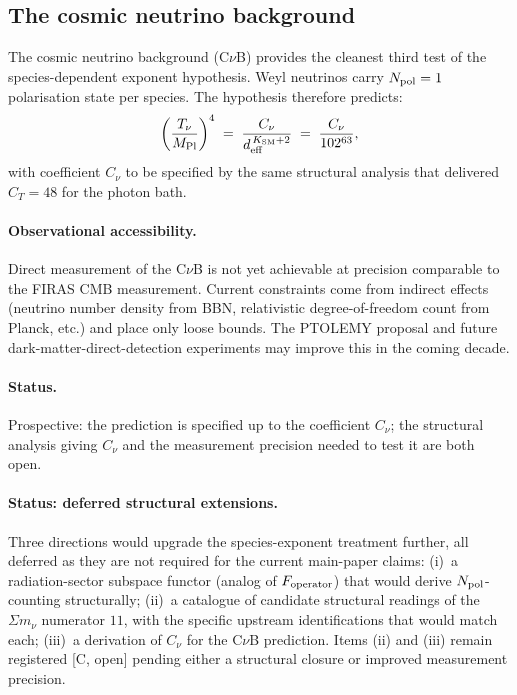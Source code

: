 \documentclass[11pt]{article}
\theoremstyle{plain}
\theoremstyle{definition}
\theoremstyle{remark}
\newcommand{\Mpl}{M_{\rm Pl}}
\begin{document}
\bigskip

\subsection{The cosmic neutrino background}\label{supp:J3}

The cosmic neutrino background (C$\nu$B) provides the cleanest third test of the species-dependent exponent hypothesis.  Weyl neutrinos carry $N_{\rm pol} = 1$ polarisation state per species.  The hypothesis therefore predicts:
\[
  \left( \frac{T_\nu}{\Mpl} \right)^4 \;=\; \frac{C_\nu}{d_{\rm eff}^{\,K_{\rm SM} + 2}} \;=\; \frac{C_\nu}{102^{63}},
\]
with coefficient $C_\nu$ to be specified by the same structural analysis that delivered $C_T = 48$ for the photon bath.

\paragraph{Observational accessibility.}  Direct measurement of the C$\nu$B is not yet achievable at precision comparable to the FIRAS CMB measurement.  Current constraints come from indirect effects (neutrino number density from BBN, relativistic degree-of-freedom count from Planck, etc.) and place only loose bounds.  The PTOLEMY proposal and future dark-matter-direct-detection experiments may improve this in the coming decade.

\paragraph{Status.}  Prospective: the prediction is specified up to the coefficient $C_\nu$; the structural analysis giving $C_\nu$ and the measurement precision needed to test it are both open.

\bigskip

\paragraph{Status: deferred structural extensions.}  Three directions would upgrade the species-exponent treatment further, all deferred as they are not required for the current main-paper claims:
(i)~a radiation-sector subspace functor (analog of $F_{\rm operator}$) that would derive $N_{\rm pol}$-counting structurally;
(ii)~a catalogue of candidate structural readings of the $\Sigma m_\nu$ numerator $11$, with the specific upstream identifications that would match each;
(iii)~a derivation of $C_\nu$ for the C$\nu$B prediction.
Items (ii) and (iii) remain registered [C, open] pending either a structural closure or improved measurement precision.
\end{document}

